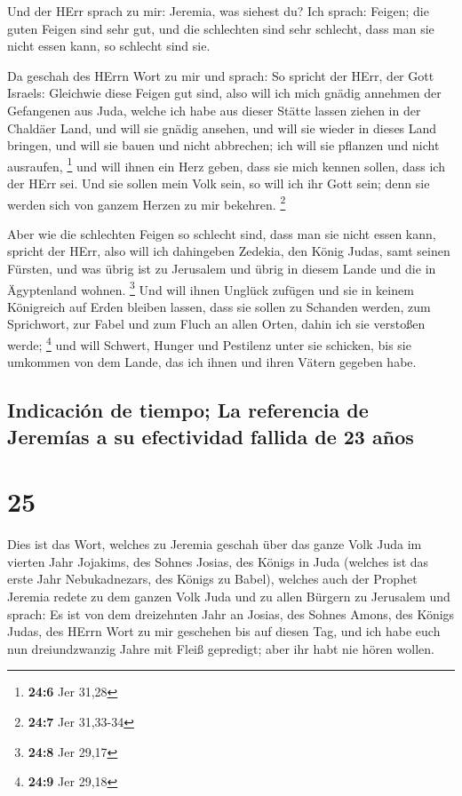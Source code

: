  Und der HErr sprach zu mir: Jeremia, was siehest du? Ich
sprach: Feigen; die guten Feigen sind sehr gut, und die schlechten sind
sehr schlecht, dass man sie nicht essen kann, so schlecht sind sie.

 Da geschah des HErrn Wort zu mir und sprach:
 So spricht der HErr, der Gott Israels: Gleichwie diese
Feigen gut sind, also will ich mich gnädig annehmen der Gefangenen aus
Juda, welche ich habe aus dieser Stätte lassen ziehen in der Chaldäer
Land,  und will sie gnädig ansehen, und will sie wieder in
dieses Land bringen, und will sie bauen und nicht abbrechen; ich will
sie pflanzen und nicht ausraufen, \footnote{\textbf{24:6} Jer 31,28}
 und will ihnen ein Herz geben, dass sie mich kennen
sollen, dass ich der HErr sei. Und sie sollen mein Volk sein, so will
ich ihr Gott sein; denn sie werden sich von ganzem Herzen zu mir
bekehren. \footnote{\textbf{24:7} Jer 31,33-34}

 Aber wie die schlechten Feigen so schlecht sind, dass man
sie nicht essen kann, spricht der HErr, also will ich dahingeben
Zedekia, den König Judas, samt seinen Fürsten, und was übrig ist zu
Jerusalem und übrig in diesem Lande und die in Ägyptenland wohnen.
\footnote{\textbf{24:8} Jer 29,17}  Und will ihnen Unglück
zufügen und sie in keinem Königreich auf Erden bleiben lassen, dass sie
sollen zu Schanden werden, zum Sprichwort, zur Fabel und zum Fluch an
allen Orten, dahin ich sie verstoßen werde; \footnote{\textbf{24:9} Jer
  29,18}  und will Schwert, Hunger und Pestilenz unter
sie schicken, bis sie umkommen von dem Lande, das ich ihnen und ihren
Vätern gegeben habe.

\hypertarget{indicaciuxf3n-de-tiempo-la-referencia-de-jeremuxedas-a-su-efectividad-fallida-de-23-auxf1os}{%
\subsection{Indicación de tiempo; La referencia de Jeremías a su
efectividad fallida de 23
años}\label{indicaciuxf3n-de-tiempo-la-referencia-de-jeremuxedas-a-su-efectividad-fallida-de-23-auxf1os}}

\hypertarget{section-24}{%
\section{25}\label{section-24}}

 Dies ist das Wort, welches zu Jeremia geschah über das
ganze Volk Juda im vierten Jahr Jojakims, des Sohnes Josias, des Königs
in Juda (welches ist das erste Jahr Nebukadnezars, des Königs zu Babel),
 welches auch der Prophet Jeremia redete zu dem ganzen
Volk Juda und zu allen Bürgern zu Jerusalem und sprach: 
Es ist von dem dreizehnten Jahr an Josias, des Sohnes Amons, des Königs
Judas, des HErrn Wort zu mir geschehen bis auf diesen Tag, und ich habe
euch nun dreiundzwanzig Jahre mit Fleiß gepredigt; aber ihr habt nie
hören wollen.

